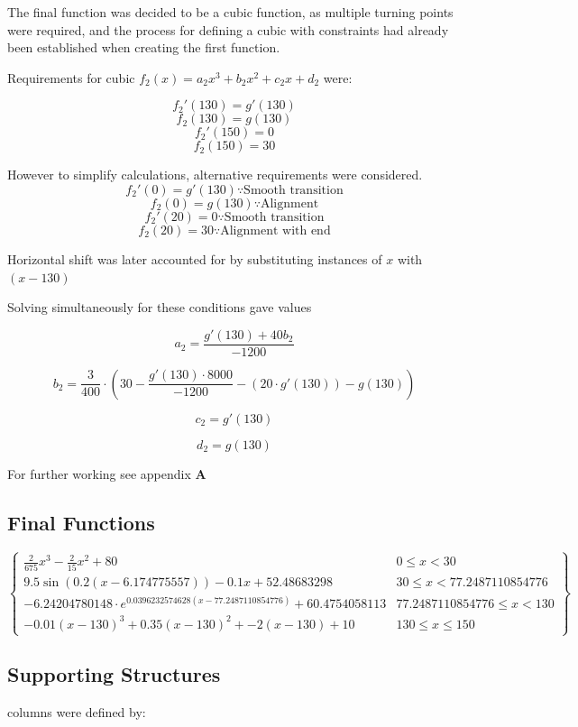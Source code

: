 \documentclass[10pt, letterpaper]{article}
\begin{document}
The final function was decided to be a cubic function, as multiple turning points were required, and the process for defining a cubic with constraints had already been established when creating the first function. 
	

Requirements for cubic $f_2(x)=a_2x^3+b_2x^2+c_2x+d_2$ were:

$$f_2'(130)=g'(130)$$
$$f_2(130)=g(130)$$
$$f_2'(150)=0$$
$$f_2(150)=30$$
	
However to simplify calculations, alternative requirements were considered.
$$f_2'(0)=g'(130)\because \textrm{Smooth transition}$$
$$f_2(0)=g(130)\because \textrm{Alignment}$$
$$f_2'(20)=0\because\textrm{Smooth transition}$$
$$f_2(20)=30\because\textrm{Alignment with end} $$

Horizontal shift was later accounted for by substituting instances of $x$ with $(x-130)$
	

Solving simultaneously for these conditions gave values 
	
	$$a_{2}=\frac{g'\left(130\right)+40b_{2}}{-1200}$$
	
	$$b_{2}=\frac{3}{400}\cdot\left(30-\frac{g'\left(130\right)\cdot8000}{-1200}-\left(20\cdot g'\left(130\right)\right)-g\left(130\right)\right)$$
	
	$$c_{2}=g'\left(130\right)$$
	
	$$d_{2}=g\left(130\right)$$

For further working see appendix $\mathbf{A}$
	


\subsection{Final Functions
}

$$
\begin{Bmatrix}
	\frac{2}{675}x^{3}-\frac{2}{15}x^{2}+80 & 0\le x<30 \\
	9.5\sin(0.2(x-6.174775557))-0.1x+52.48683298  & 30\le x<77.2487110854776 \\
	-6.24204780148\cdot e^{0.0396232574628(x-77.2487110854776)} + 60.4754058113 & 77.2487110854776 \leq x < 130 \\
	
	-0.01(x-130)^{3}+0.35\left(x-130\right)^{2}+-2\left(x-130\right)+10 & 130\le x\leq150
	
\end{Bmatrix}
$$




\subsection{Supporting Structures}
columns were defined by:
\end{document}

